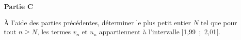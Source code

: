 \bigskip

\textbf{Partie C}

\medskip

À l'aide des parties précédentes, déterminer le plus petit entier $N$ tel que pour tout $n \geqslant N$, les termes $v_n$ et $u_n$ appartiennent à l'intervalle ]1,99~;~2,01[.

\bigskip

